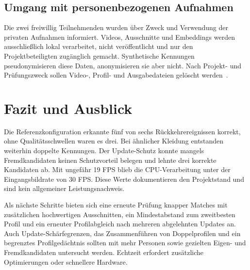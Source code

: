 \documentclass[runningheads,a4paper]{llncs}
\begin{document}
\subsection{Umgang mit personenbezogenen Aufnahmen}
\label{sec:privacy}

Die zwei freiwillig Teilnehmenden wurden über Zweck und Verwendung der privaten Aufnahmen informiert. Videos, Ausschnitte und Embeddings werden ausschlie{\ss}lich lokal verarbeitet, nicht veröffentlicht und nur den Projektbeteiligten zugänglich gemacht. Synthetische Kennungen pseudonymisieren diese Daten, anonymisieren sie aber nicht. Nach Projekt- und Prüfungszweck sollen Video-, Profil- und Ausgabedateien gelöscht werden~\cite{gdpr,edpb-video}.

\section{Fazit und Ausblick}

Die Referenzkonfiguration erkannte fünf von sechs Rückkehrereignissen korrekt, ohne Qualitätsschwellen waren es drei. Bei ähnlicher Kleidung entstanden weiterhin doppelte Kennungen. Der Update-Schutz konnte mangels Fremdkandidaten keinen Schutzvorteil belegen und lehnte drei korrekte Kandidaten ab. Mit ungefähr 19 FPS blieb die CPU-Verarbeitung unter der Eingangsbildrate von 30 FPS. Diese Werte dokumentieren den Projektstand und sind kein allgemeiner Leistungsnachweis.

Als nächste Schritte bieten sich eine erneute Prüfung knapper Matches mit zusätzlichen hochwertigen Ausschnitten, ein Mindestabstand zum zweitbesten Profil und ein erneuter Profilabgleich nach mehreren abgelehnten Updates an. Auch Update-Schärfegrenzen, das Zusammenführen von Doppelprofilen und ein begrenztes Profilgedächtnis sollten mit mehr Personen sowie gezielten Eigen- und Fremdkandidaten untersucht werden. Echtzeit erfordert zusätzliche Optimierungen oder schnellere Hardware.

\end{document}
